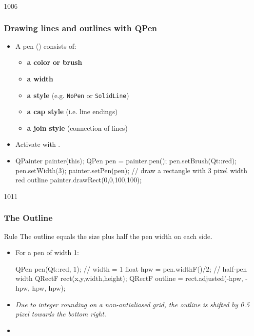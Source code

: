 \begin{slide}[fragile]{1006}\frametitle{Drawing lines and outlines
    with QPen}
\begin{itemize}
  \item A pen () consists of:
    \begin{itemize}
    \item \textbf{a color or brush}
    \item \textbf{a width}
    \item \textbf{a style} (e.g. \texttt{NoPen} or \texttt{SolidLine})
    \item \textbf{a cap style} (i.e. line endings)
    \item \textbf{a join style} (connection of lines)
    \end{itemize}
  \item Activate with . 
  \item[] \begin{cpp}
QPainter painter(this);
QPen pen = painter.pen();
pen.setBrush(Qt::red);
pen.setWidth(3);
painter.setPen(pen);          
// draw a rectangle with 3 pixel width red outline
painter.drawRect(0,0,100,100);
  \end{cpp}
  \end{itemize}
\end{slide}    

\begin{slide}[fragile]{1011}
\frametitle{The Outline}
\begin{block}{Rule}
The outline equals the size plus half the pen width on each side.
\end{block}

\begin{itemize}
\item For a pen of width 1:
\begin{cpp}
QPen pen(Qt::red, 1); // width = 1
float hpw = pen.widthF()/2; // half-pen width
QRectF rect(x,y,width,height);
QRectF outline = rect.adjusted(-hpw, -hpw, hpw, hpw);
\end{cpp}
\item  \textit{Due to integer rounding on a
    non-antialiased grid,
    the outline is shifted by 0.5 pixel towards the bottom right.}
\item {}
\end{itemize}
\end{slide}

